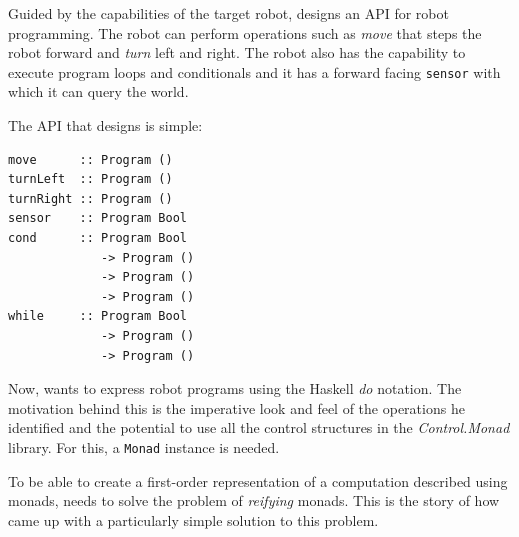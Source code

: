 Guided by the capabilities of the target robot, \studname{} designs an API for 
robot programming. The robot can perform operations 
such as {\em move} that steps the robot forward and {\em turn} left and right. 
The robot also has the capability to execute program loops and conditionals and 
it has a forward facing {\tt sensor} with which it can query the world.

\pagebreak
The API that \studname{} designs is simple: 

\begin{small}
\begin{verbatim} 
move      :: Program () 
turnLeft  :: Program () 
turnRight :: Program ()
sensor    :: Program Bool 
cond      :: Program Bool 
             -> Program () 
             -> Program () 
             -> Program () 
while     :: Program Bool 
             -> Program () 
             -> Program () 
\end{verbatim}
\end{small} 

Now, \studname{} wants to express robot programs using the Haskell
{\em do} notation. The motivation behind this is the imperative look
and feel of the operations he identified and the potential to use all
the control structures in the {\em Control.Monad} library. For this, a
{\tt Monad} instance is needed.

To be able to create a first-order representation of a computation
described using monads, \studname{} needs to solve the problem of {\em
  reifying} monads. This is the story of how \studname{} came up with
a particularly simple solution to this problem.





